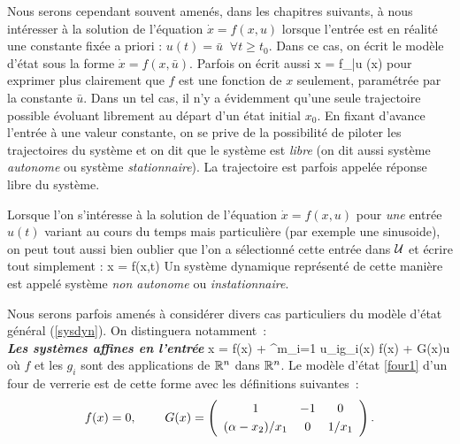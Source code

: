Nous serons cependant souvent amenés, dans les chapitres suivants, à nous
intéresser à la solution de l'équation $\dot x = f(x,u)$ lorsque l'entrée est
en réalité une constante fixée a priori : $u(t) = \bar u \;\; \forall t \geq
t_0$.  Dans ce cas, on écrit le modèle d'état sous la forme $\dot x = f(x,
\bar u)$.  Parfois on écrit aussi 
\eqnn
\dot x = f_{\bar u} (x)
\eeqnn
pour exprimer plus clairement que $f$ est une fonction de $x$ seulement,
paramétrée par la constante $\bar u$.  Dans un tel cas, il n'y a évidemment
qu'une seule trajectoire possible évoluant librement au départ d'un état
initial $x_0$.  En fixant d'avance l'entrée à une valeur constante, on se
prive de la possibilité de piloter les trajectoires du système et on dit que
le système est {\em libre} (on dit aussi système {\em autonome} ou système
{\em stationnaire}).  La trajectoire est parfois appelée {réponse libre} du
système.  

Lorsque l'on s'intéresse à la solution de l'équation $\dot x = f(x,u)$ pour
{\em une} entrée $u(t)$ variant au cours du temps mais particulière (par
exemple une sinusoide), on peut tout aussi bien oublier que l'on a
sélectionné cette entrée dans ${\cal U}$ et écrire tout simplement : 
\eqnn
\dot x = f(x,t)
\eeqnn
Un système dynamique représenté de cette manière est appelé système {\em  non
autonome} ou {\em instationnaire}.  

Nous serons parfois amenés à considérer divers cas particuliers du modèle
d'état général (\ref{sysdyn}).  On distinguera notamment~:\\

\noindent \textbf{\textit{Les systèmes affines en l'entrée}}
\eqnn
\dot x = f(x) + \sum^m_{i=1} u_ig_i(x) \triangleq f(x) + G(x)u
\eeqnn
où $f$ et les $g_i$ sont des applications de $\mathbb{R}^n$ dans $\mathbb{R}^n$.
Le modèle d'état \eqref{four1} d'un four de verrerie est de cette forme avec les définitions suivantes~:
\begin{equation*}
f(x) = 0, \hh \hh \hh \hh G(x) = \left(\begin{array}{ccc}
1&-1 & 0 \\[0.3em] (\alpha-x_2)/x_1 & 0 & 1/x_1 \end{array} \right).
\end{equation*}\\

